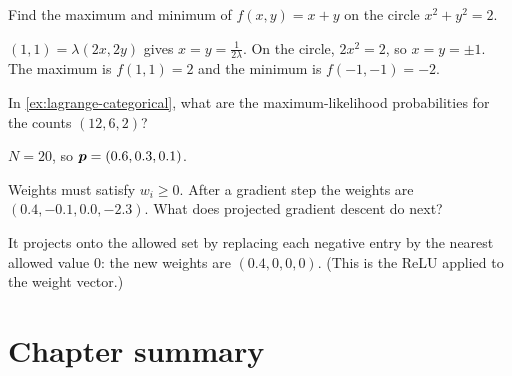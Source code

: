 \begin{exercise}
Find the maximum and minimum of $f(x, y) = x + y$ on the circle
$x^2 + y^2 = 2$.
\end{exercise}
\begin{solution}
$(1, 1) = \lambda(2x, 2y)$ gives $x = y = \tfrac{1}{2\lambda}$. On the circle,
$2x^2 = 2$, so $x = y = \pm1$. The maximum is $f(1, 1) = 2$ and the minimum is
$f(-1, -1) = -2$.
\end{solution}

\begin{exercise}
In \cref{ex:lagrange-categorical}, what are the maximum-likelihood probabilities
for the counts $(12, 6, 2)$?
\end{exercise}
\begin{solution}
$N = 20$, so $\bm{p} = (0.6, 0.3, 0.1)$.
\end{solution}

\begin{exercise}
Weights must satisfy $w_i \ge 0$. After a gradient step the weights are
$(0.4, -0.1, 0.0, -2.3)$. What does projected gradient descent do next?
\end{exercise}
\begin{solution}
It projects onto the allowed set by replacing each negative entry by the nearest
allowed value $0$: the new weights are $(0.4, 0, 0, 0)$. (This is the ReLU applied
to the weight vector.)
\end{solution}

\section{Chapter summary}\label{sec:ch8-summary}

